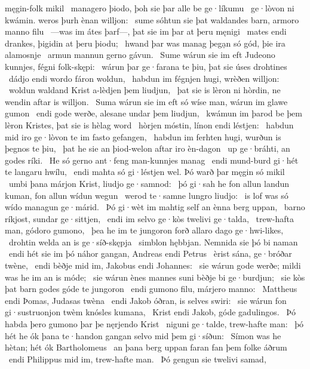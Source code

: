 męgin-folk mikil \hld\ managero þiodo,
þoh sie þar alle be ge·líkumu \hld\ ge·lòvon ni kwámin.
weros þurh ènan willjon: \hld\ sume sóhtun sie þat waldandes barn,
armoro manno filu \hld\ —was im átes þarf—,
þat sie im þar at þeru męnigi \hld\ mates endi drankes,
þigidin at þeru þiodu; \hld\ hwand þar was manag þegạn só gód,
þie ira alamosnje \hld\ armun mannun
gerno gávun. \hld\ Sume wárun sie im eft Judeono kunnjes,
fégni folk-skępi: \hld\ wárun þar ge·farana te þiu,
þat sie úses drohtines \hld\ dádjo endi wordo
fáron woldun, \hld\ habdun im fégnjen hugi,
wrèðen willjon: \hld\ woldun waldand Krist
a-lèdjen þem liudjun, \hld\ þat sie is lèron ni hòrdin,
ne wendin aftar is willjon. \hld\ Suma wárun sie im eft só wíse man,
wárun im glawe gumon \hld\ endi gode werðe,
alesane undar þem liudjun, \hld\ kwámun im þarod be þem lèron Kristes,
þat sie is hèlag word \hld\ hòrjen móstin,
línon endi léstjen: \hld\ habdun mid iro ge·lòvon te im
fasto gefangen, \hld\ habdun im ferhten hugi,
wurðun is þegnos te þiu, \hld\ þat he sie an þiod-welon
aftar iro èn-dagon \hld\ up ge·bráhti,
an godes ríki. \hld\ He só gerno ant·feng
man-kunnjes manag \hld\ endi mund-burd gi·hét
te langaru hwílu, \hld\ endi mahta só gi·léstjen wel.
Þó warð þar męgin só mikil \hld\ umbi þana márjon Krist,
liudjo ge·samnod: \hld\ þó gi·sah he fon allun landun kuman,
fon allun wídun wegun \hld\ werod te·samne
lungro liudjo: \hld\ is lof was só wído
managun ge·márid. \hld\ Þó gi·wèt im mahtig self
an ènna berg uppan, \hld\ barno ríkjost,
sundar ge·sittjen, \hld\ endi im selvo ge·kòs
twelivi ge·talda, \hld\ trew-hafta man,
gódoro gumono, \hld\ þea he im te jungoron forð
allaro dago ge·hwi-likes, \hld\ drohtin welda
an is ge·síð-skępja \hld\ simblon hębbjan.
Nemnida sie þó bi naman \hld\ endi hét sie im þó náhor gangan,
Andreas endi Petrus \hld\ èrist sána,
ge·bróðar twène, \hld\ endi bèðje mid im,
Jakobus endi Johannes: \hld\ sie wárun gode werðe;
mildi was he im an is móde; \hld\ sie wárun ènes mannes suni
bèðje bi ge·burdjun; \hld\ sie kòs þat barn godes
góde te jungoron \hld\ endi gumono filu,
márjero manno: \hld\ Mattheus endi Þomas,
Judasas twèna \hld\ endi Jakob óðran,
is selves swiri: \hld\ sie wárun fon gi·sustruonjon twèm
knósles kumana, \hld\ Krist endi Jakob,
góde gadulingos. \hld\ Þó habda þero gumono þar
þe nęrjendo Krist \hld\ niguni ge·talde, %
trew-hafte man: \hld\ þó hét he ók þana te·handon gangan
selvo mid þem gi·síðun: \hld\ Símon was he hètan;
hét ók Bartholomeus \hld\ an þana berg uppan
faran fan þem folke áðrum \hld\ endi Philippus mid im,
trew-hafte man. \hld\ Þó gengun sie twelivi samad,
